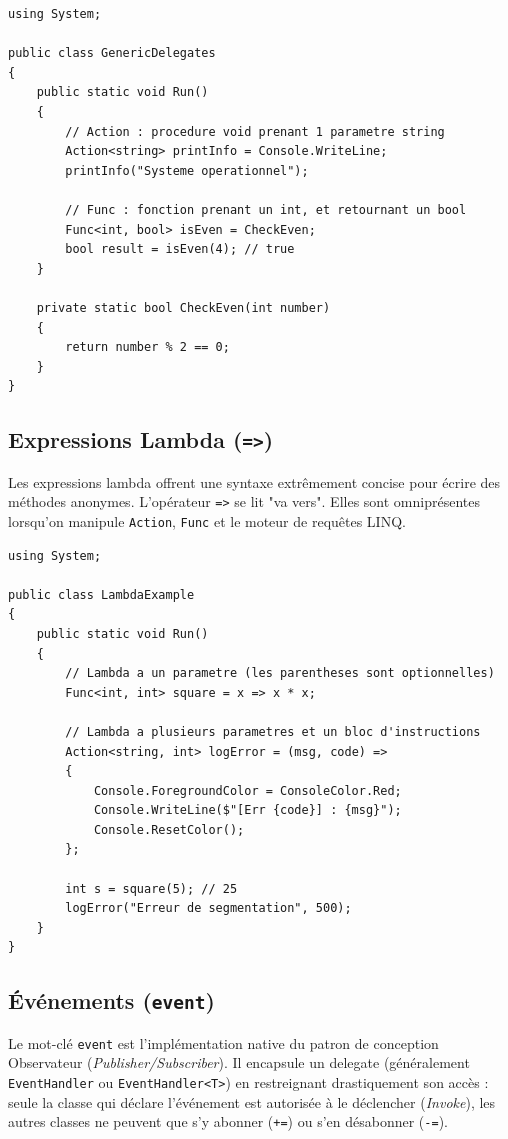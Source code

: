 \begin{lstlisting}[language={[Sharp]C}]
using System;

public class GenericDelegates
{
    public static void Run()
    {
        // Action : procedure void prenant 1 parametre string
        Action<string> printInfo = Console.WriteLine;
        printInfo("Systeme operationnel");

        // Func : fonction prenant un int, et retournant un bool
        Func<int, bool> isEven = CheckEven;
        bool result = isEven(4); // true
    }

    private static bool CheckEven(int number)
    {
        return number % 2 == 0;
    }
}
\end{lstlisting}

\subsection{Expressions Lambda (\texttt{=>})}

Les expressions lambda offrent une syntaxe extrêmement concise pour écrire des méthodes anonymes. L'opérateur \texttt{=>} se lit "va vers". Elles sont omniprésentes lorsqu'on manipule \texttt{Action}, \texttt{Func} et le moteur de requêtes LINQ.

\begin{lstlisting}[language={[Sharp]C}]
using System;

public class LambdaExample
{
    public static void Run()
    {
        // Lambda a un parametre (les parentheses sont optionnelles)
        Func<int, int> square = x => x * x;
        
        // Lambda a plusieurs parametres et un bloc d'instructions
        Action<string, int> logError = (msg, code) => 
        {
            Console.ForegroundColor = ConsoleColor.Red;
            Console.WriteLine($"[Err {code}] : {msg}");
            Console.ResetColor();
        };

        int s = square(5); // 25
        logError("Erreur de segmentation", 500);
    }
}
\end{lstlisting}

\subsection{Événements (\texttt{event})}

Le mot-clé \texttt{event} est l'implémentation native du patron de conception Observateur (\textit{Publisher/Subscriber}). Il encapsule un delegate (généralement \texttt{EventHandler} ou \texttt{EventHandler<T>}) en restreignant drastiquement son accès : seule la classe qui déclare l'événement est autorisée à le déclencher (\textit{Invoke}), les autres classes ne peuvent que s'y abonner (\texttt{+=}) ou s'en désabonner (\texttt{-=}).

